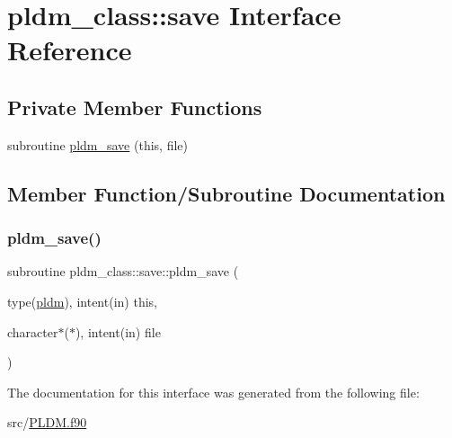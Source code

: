 \hypertarget{interfacepldm__class_1_1save}{}\section{pldm\+\_\+class\+:\+:save Interface Reference}
\label{interfacepldm__class_1_1save}
\subsection*{Private Member Functions}
\begin{DoxyCompactItemize}
\item 
subroutine \hyperlink{interfacepldm__class_1_1save_a28b088e5efb62ec7681d3c32fedfb393}{pldm\+\_\+save} (this, file)
\end{DoxyCompactItemize}


\subsection{Member Function/\+Subroutine Documentation}
\mbox{\label{interfacepldm__class_1_1save_a28b088e5efb62ec7681d3c32fedfb393}} 
\subsubsection{\texorpdfstring{pldm\+\_\+save()}{pldm\_save()}}
{\footnotesize\ttfamily subroutine pldm\+\_\+class\+::save\+::pldm\+\_\+save (\begin{DoxyParamCaption}\item[{type(\hyperlink{structpldm__class_1_1pldm}{pldm}), intent(in)}]{this,  }\item[{character$\ast$($\ast$), intent(in)}]{file }\end{DoxyParamCaption})\hspace{0.3cm}{\ttfamily [private]}}



The documentation for this interface was generated from the following file\+:\begin{DoxyCompactItemize}
\item 
src/\hyperlink{_p_l_d_m_8f90}{P\+L\+D\+M.\+f90}\end{DoxyCompactItemize}
